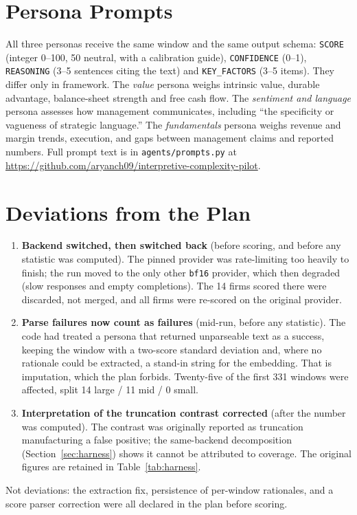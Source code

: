 \documentclass[sigconf,nonacm]{acmart}
\begin{document}
\section{Persona Prompts}
\label{app:prompts}
All three personas receive the same window and the same output schema: \texttt{SCORE}
(integer 0--100, 50 neutral, with a calibration guide), \texttt{CONFIDENCE} (0--1),
\texttt{REASONING} (3--5 sentences citing the text) and \texttt{KEY\_FACTORS} (3--5
items). They differ only in framework. The \emph{value} persona weighs intrinsic value,
durable advantage, balance-sheet strength and free cash flow. The \emph{sentiment and
language} persona assesses how management communicates, including ``the specificity or
vagueness of strategic language.'' The \emph{fundamentals} persona weighs revenue and
margin trends, execution, and gaps between management claims and reported numbers.
Full prompt text is in \texttt{agents/prompts.py} at \url{https://github.com/aryanch09/interpretive-complexity-pilot}.

\section{Deviations from the Plan}
\label{app:deviations}
\begin{enumerate}
\item \textbf{Backend switched, then switched back} (before scoring, and before any
statistic was computed). The pinned provider was rate-limiting too heavily to finish;
the run moved to the only other \texttt{bf16} provider, which then degraded (slow
responses and empty completions). The 14 firms scored there were discarded, not merged,
and all \NFirms{} firms were re-scored on the original provider.
\item \textbf{Parse failures now count as failures} (mid-run, before any statistic).
The code had treated a persona that returned unparseable text as a success, keeping
the window with a two-score standard deviation and, where no rationale could be
extracted, a stand-in string for the embedding. That is imputation, which the plan
forbids. Twenty-five of the first 331 windows were affected, split 14 large / 11 mid /
0 small.
\item \textbf{Interpretation of the truncation contrast corrected} (after the number was
computed). The contrast was originally reported as truncation manufacturing a false
positive; the same-backend decomposition (Section~\ref{sec:harness}) shows it cannot be
attributed to coverage. The original figures are retained in Table~\ref{tab:harness}.
\end{enumerate}
Not deviations: the extraction fix, persistence of per-window rationales, and a score
parser correction were all declared in the plan before scoring.
\end{document}
